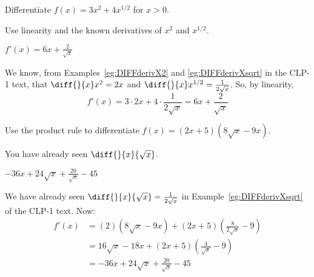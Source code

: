 \begin{question}Differentiate $f(x)=3x^2+4x^{1/2}$ for $x>0$.
\end{question}
\begin{hint} Use linearity and the known derivatives of $x^2$ and $x^{1/2}$.
\end{hint}
\begin{answer} $f'(x)=6x+\frac{2}{\sqrt{x}}$
\end{answer}
\begin{solution}
We know, from Examples~\ref*{eg:DIFFderivX2} and \ref*{eg:DIFFderivXsqrt} 
in the CLP-1 text, that $\diff{}{x}x^2=2x$ and 
$\diff{}{x}x^{1/2}=\frac{1}{2\sqrt{x}}$. So, by linearity,
\begin{equation*}
f'(x)=3\cdot 2x+ 4\cdot \frac{1}{2\sqrt{x}}
=6x+\frac{2}{\sqrt{x}}
\end{equation*}
\end{solution}





\begin{Mquestion}Use the product rule to differentiate $f(x)=(2x+5)(8\sqrt{x}-9x)$.
\end{Mquestion}
\begin{hint} You have already seen $\diff{}{x}\{\sqrt{x}\}$.
\end{hint}
\begin{answer} $-36x+24\sqrt{x}+\frac{20}{\sqrt{x}}-45$
\end{answer}
\begin{solution} We have already seen $\diff{}{x}\{\sqrt{x}\}=\frac{1}{2\sqrt{x}}$ in 
Example~\ref*{eg:DIFFderivXsqrt}  of the CLP-1 text. 
 Now:
 \begin{align*}f'(x) &= (2)(8\sqrt{x}-9x)+(2x+5)\left(\frac{8}{2\sqrt{x}}-9\right)\\
 &= 16\sqrt{x}-18x+(2x+5)\left(\frac{4}{\sqrt{x}}-9\right)\\
 &=-36x+24\sqrt{x}+\frac{20}{\sqrt{x}}-45
 \end{align*}
\end{solution}




